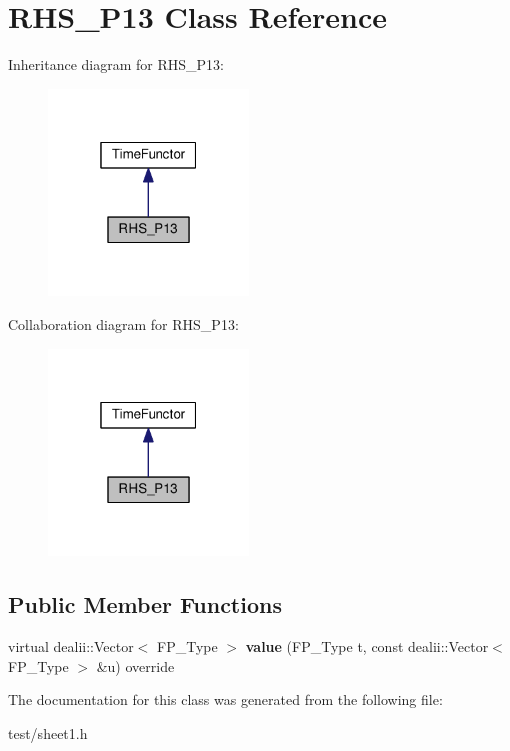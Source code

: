 \hypertarget{classRHS__P13}{}\section{R\+H\+S\+\_\+\+P13 Class Reference}
\label{classRHS__P13}


Inheritance diagram for R\+H\+S\+\_\+\+P13\+:\nopagebreak
\begin{figure}[H]
\begin{center}
\leavevmode
\includegraphics[width=151pt]{classRHS__P13__inherit__graph}
\end{center}
\end{figure}


Collaboration diagram for R\+H\+S\+\_\+\+P13\+:\nopagebreak
\begin{figure}[H]
\begin{center}
\leavevmode
\includegraphics[width=151pt]{classRHS__P13__coll__graph}
\end{center}
\end{figure}
\subsection*{Public Member Functions}
\begin{DoxyCompactItemize}
\item 
\mbox{\label{classRHS__P13_aeadc621d471867cf96c3d62ae7f512af}} 
virtual dealii\+::\+Vector$<$ F\+P\+\_\+\+Type $>$ {\bfseries value} (F\+P\+\_\+\+Type t, const dealii\+::\+Vector$<$ F\+P\+\_\+\+Type $>$ \&u) override
\end{DoxyCompactItemize}


The documentation for this class was generated from the following file\+:\begin{DoxyCompactItemize}
\item 
test/sheet1.\+h\end{DoxyCompactItemize}
